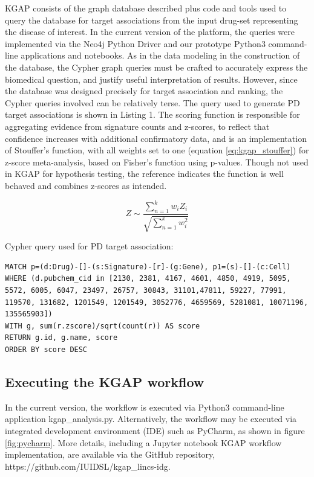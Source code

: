 KGAP consists of the graph database described plus code and tools used to query the database for target associations from the input drug-set representing the disease of interest. In the current version of the platform, the queries were implemented via the Neo4j Python Driver\cite{Neo4j_Inc_undated-ly} and our prototype Python3 command-line applications and notebooks. As in the data modeling in the construction of the database, the Cypher graph queries must be crafted to accurately express the biomedical question, and justify useful interpretation of results. However, since the database was designed precisely for target association and ranking, the Cypher queries involved can be relatively terse. The query used to generate PD target associations is shown in Listing 1. The scoring function is responsible for aggregating evidence from signature counts and z-scores, to reflect that confidence increases with additional confirmatory data, and is an implementation of Stouffer's function, with all weights set to one (equation \ref{eq:kgap_stouffer}) for z-score meta-analysis, based on Fisher's function using p-values\cite{Rosenthal1978-in}. Though not used in KGAP for hypothesis testing, the reference indicates the function is well behaved and combines z-scores as intended. 

\begin{equation}
Z \sim \frac{\sum_{n=1}^{k}w_iZ_i}{\sqrt{\sum_{n=1}^{k}w_i^2}}
\label{eq:kgap_stouffer}
\end{equation}

Cypher query used for PD target association:

\begin{lstlisting}
MATCH p=(d:Drug)-[]-(s:Signature)-[r]-(g:Gene), p1=(s)-[]-(c:Cell)
WHERE (d.pubchem_cid in [2130, 2381, 4167, 4601, 4850, 4919, 5095, 5572, 6005, 6047, 23497, 26757, 30843, 31101,47811, 59227, 77991, 119570, 131682, 1201549, 1201549, 3052776, 4659569, 5281081, 10071196, 135565903])
WITH g, sum(r.zscore)/sqrt(count(r)) AS score
RETURN g.id, g.name, score
ORDER BY score DESC
\end{lstlisting}

\subsection{Executing the KGAP workflow}

In the current version, the workflow is executed via Python3 command-line application kgap\_analysis.py. Alternatively, the workflow may be executed via integrated development environment (IDE) such as PyCharm, as shown in figure \ref{fig:pycharm}. More details, including a Jupyter notebook KGAP workflow implementation, are available via the GitHub repository, https://github.com/IUIDSL/kgap\_lincs-idg. 

